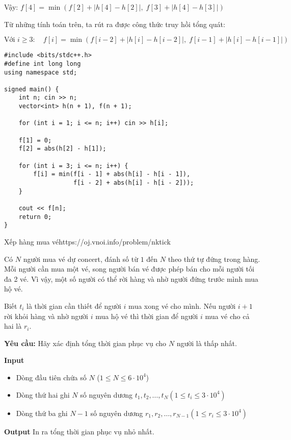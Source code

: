 Vậy: $ f[4] = \min \left( f[2] + |h[4] - h[2]|, \; f[3] + |h[4] - h[3]| \right) $


Từ những tính toán trên, ta rút ra được công thức truy hồi tổng quát:

\[
\text{Với } i \geq 3: \quad f[i] = \min \left( f[i - 2] + |h[i] - h[i-2]|, \; f[i - 1] + |h[i] - h[i-1]| \right)
\]

\begin{lstlisting}[title=\centering \textbf{Cài đặt}]
#include <bits/stdc++.h>
#define int long long
using namespace std;

signed main() {
    int n; cin >> n;
    vector<int> h(n + 1), f(n + 1);

    for (int i = 1; i <= n; i++) cin >> h[i];

    f[1] = 0;
    f[2] = abs(h[2] - h[1]);

    for (int i = 3; i <= n; i++) {
        f[i] = min(f[i - 1] + abs(h[i] - h[i - 1]),
                   f[i - 2] + abs(h[i] - h[i - 2]));
    }

    cout << f[n];
    return 0;
}
\end{lstlisting}

\begin{baitap}{Xếp hàng mua vé}{https://oj.vnoi.info/problem/nktick}

Có $N$ người mua vé dự concert, đánh số từ $1$ đến $N$ theo thứ tự đứng trong hàng.  
Mỗi người cần mua một vé, song người bán vé được phép bán cho mỗi người tối đa 2 vé.  
Vì vậy, một số người có thể rời hàng và nhờ người đứng trước mình mua hộ vé.  

Biết $t_i$ là thời gian cần thiết để người $i$ mua xong vé cho mình.  
Nếu người $i + 1$ rời khỏi hàng và nhờ người $i$ mua hộ vé thì thời gian để người $i$ mua vé cho cả hai là $r_i$.  

\textbf{Yêu cầu:} Hãy xác định tổng thời gian phục vụ cho $N$ người là thấp nhất.

\textbf{Input}
\begin{itemize}[noitemsep]
    \item Dòng đầu tiên chứa số $N$ ($1 \leq N \leq 6 \cdot 10^4$)
    \item Dòng thứ hai ghi $N$ số nguyên dương $t_1, t_2, \dots, t_N (1 \leq t_i \leq 3 \cdot 10^4)$
    \item Dòng thứ ba ghi $N - 1$ số nguyên dương $r_1, r_2, \dots, r_{N - 1} (1 \leq r_i \leq 3 \cdot 10^4)$
\end{itemize}

\textbf{Output}
In ra tổng thời gian phục vụ nhỏ nhất.

\end{baitap}

